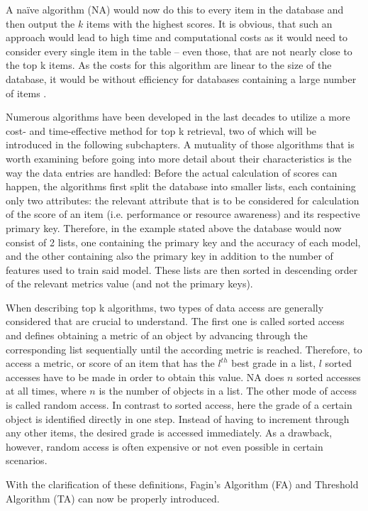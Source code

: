 A naïve algorithm (NA) would now do this to every item in the database and then output the $k$ items with the highest scores. It is obvious, that such an approach would lead to high time and computational costs as it would need to consider every single item in the table – even those, that are not nearly close to the top k items. As the costs for this algorithm are linear to the size of the database, it would be without efficiency for databases containing a large number of items \cite{fagin2002}.

Numerous algorithms have been developed in the last decades to utilize a more cost- and time-effective method for top k retrieval, two of which will be introduced in the following subchapters. A mutuality of those algorithms that is worth examining before going into more detail about their characteristics is the way the data entries are handled: Before the actual calculation of scores can happen, the algorithms first split the database into smaller lists, each containing only two attributes: the relevant attribute that is to be considered for calculation of the score of an item (i.e. performance or resource awareness) and its respective primary key. Therefore, in the example stated above the database would now consist of 2 lists, one containing the primary key and the accuracy of each model, and the other containing also the primary key in addition to the number of features used to train said model. These lists are then sorted in descending order of the relevant metrics value (and not the primary keys).

When describing top k algorithms, two types of data access are generally considered that are crucial to understand. The first one is called sorted access and defines obtaining a metric of an object by advancing through the corresponding list sequentially until the according metric is reached. Therefore, to access a metric, or score of an item that has the $l^{th}$ best grade in a list, $l$ sorted accesses have to be made in order to obtain this value. NA does $n$ sorted accesses at all times, where $n$ is the number of objects in a list. The other mode of access is called random access. In contrast to sorted access, here the grade of a certain object is identified directly in one step. Instead of having to increment through any other items, the desired grade is accessed immediately. As a drawback, however, random access is often expensive or not even possible in certain scenarios.

With the clarification of these definitions, Fagin’s Algorithm (FA) and Threshold Algorithm (TA) can now be properly introduced.



